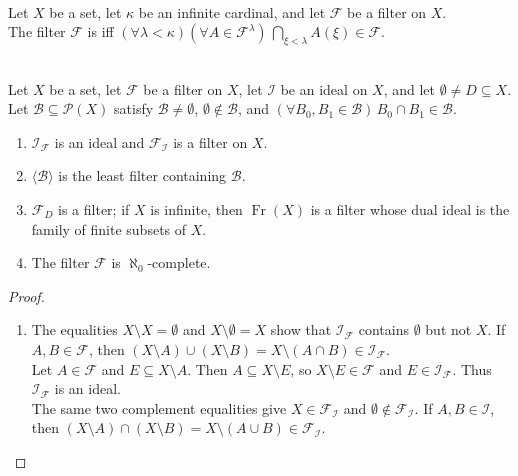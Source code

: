 \begin{definition} \label{def:kappa-complete-filter} \\
Let $X$ be a set, let $\kappa$ be an infinite cardinal, and let $\mathcal{F}$ be a filter on $X$.\\
The filter $\mathcal{F}$ is  iff $(\forall\lambda<\kappa)(\forall A\in\mathcal{F}^{\lambda})\,\bigcap\limits_{\xi<\lambda}A(\xi)\in\mathcal{F}$.
\end{definition}

\begin{proposition} \label{prop:basic-filter-and-ideal-constructions} \\
Let $X$ be a set, let $\mathcal{F}$ be a filter on $X$, let $\mathcal{I}$ be an ideal on $X$, and let $\emptyset\neq D\subseteq X$.\\
Let $\mathcal{B}\subseteq\mathcal{P}(X)$ satisfy $\mathcal{B}\neq\emptyset$, $\emptyset\notin\mathcal{B}$, and $(\forall B_0,B_1\in\mathcal{B})\,B_0\cap B_1\in\mathcal{B}$.
\begin{enumerate}[label=(\roman*)]
\setlength{\itemsep}{0pt}
\item $\mathcal{I}_{\mathcal{F}}$ is an ideal and $\mathcal{F}_{\mathcal{I}}$ is a filter on $X$.
\item $\langle\mathcal{B}\rangle$ is the least filter containing $\mathcal{B}$.
\item $\mathcal{F}_D$ is a filter; if $X$ is infinite, then $\operatorname{Fr}(X)$ is a filter whose dual ideal is the family of finite subsets of $X$.
\item The filter $\mathcal{F}$ is $\aleph_0$-complete.
\end{enumerate}
\begin{proof}
\begin{enumerate}[label=(\roman*)]
\setlength{\itemsep}{0pt}
\item The equalities $X\setminus X=\emptyset$ and $X\setminus\emptyset=X$ show that $\mathcal{I}_{\mathcal{F}}$ contains $\emptyset$ but not $X$. If $A,B\in\mathcal{F}$, then $(X\setminus A)\cup(X\setminus B)=X\setminus(A\cap B)\in\mathcal{I}_{\mathcal{F}}$.\\
Let $A\in\mathcal{F}$ and $E\subseteq X\setminus A$. Then $A\subseteq X\setminus E$, so $X\setminus E\in\mathcal{F}$ and $E\in\mathcal{I}_{\mathcal{F}}$. Thus $\mathcal{I}_{\mathcal{F}}$ is an ideal.\\
The same two complement equalities give $X\in\mathcal{F}_{\mathcal{I}}$ and $\emptyset\notin\mathcal{F}_{\mathcal{I}}$. If $A,B\in\mathcal{I}$, then $(X\setminus A)\cap(X\setminus B)=X\setminus(A\cup B)\in\mathcal{F}_{\mathcal{I}}$.\\

\end{enumerate}
\end{proof}
\end{proposition}
